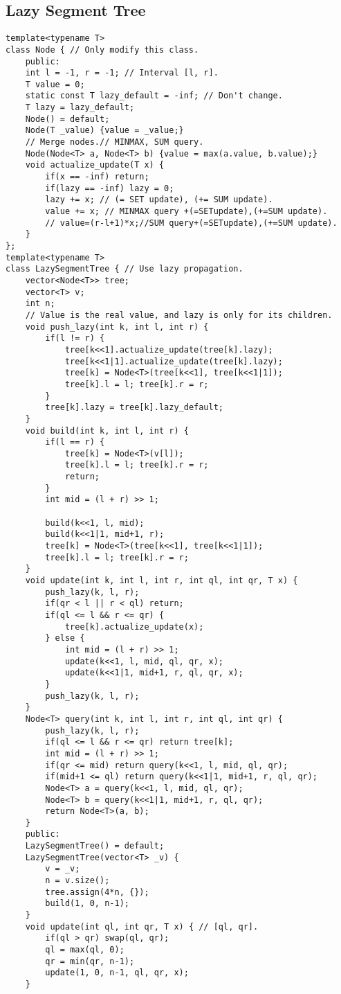 \documentclass[a4paper]{article}
\begin{document}
\subsection*{Lazy Segment Tree}
\begin{multicols}{2}
\begin{verbatim}
template<typename T>
class Node { // Only modify this class.
    public:
    int l = -1, r = -1; // Interval [l, r].
    T value = 0;
    static const T lazy_default = -inf; // Don't change.
    T lazy = lazy_default;
    Node() = default;
    Node(T _value) {value = _value;}
    // Merge nodes.// MINMAX, SUM query.
    Node(Node<T> a, Node<T> b) {value = max(a.value, b.value);} 
    void actualize_update(T x) {
        if(x == -inf) return;
        if(lazy == -inf) lazy = 0;
        lazy += x; // (= SET update), (+= SUM update).
        value += x; // MINMAX query +(=SETupdate),(+=SUM update).
        // value=(r-l+1)*x;//SUM query+(=SETupdate),(+=SUM update).
    }
};
template<typename T>
class LazySegmentTree { // Use lazy propagation.
    vector<Node<T>> tree;
    vector<T> v;
    int n;
    // Value is the real value, and lazy is only for its children.
    void push_lazy(int k, int l, int r) {
        if(l != r) {
            tree[k<<1].actualize_update(tree[k].lazy);
            tree[k<<1|1].actualize_update(tree[k].lazy);
            tree[k] = Node<T>(tree[k<<1], tree[k<<1|1]);
            tree[k].l = l; tree[k].r = r;
        }
        tree[k].lazy = tree[k].lazy_default;
    }
    void build(int k, int l, int r) {
        if(l == r) {
            tree[k] = Node<T>(v[l]);
            tree[k].l = l; tree[k].r = r;
            return;
        }
        int mid = (l + r) >> 1;
        
        build(k<<1, l, mid);
        build(k<<1|1, mid+1, r);
        tree[k] = Node<T>(tree[k<<1], tree[k<<1|1]);
        tree[k].l = l; tree[k].r = r;
    }
    void update(int k, int l, int r, int ql, int qr, T x) {
        push_lazy(k, l, r);
        if(qr < l || r < ql) return;
        if(ql <= l && r <= qr) {
            tree[k].actualize_update(x);
        } else {
            int mid = (l + r) >> 1;
            update(k<<1, l, mid, ql, qr, x);
            update(k<<1|1, mid+1, r, ql, qr, x);
        }
        push_lazy(k, l, r);
    }
    Node<T> query(int k, int l, int r, int ql, int qr) {
        push_lazy(k, l, r);
        if(ql <= l && r <= qr) return tree[k];
        int mid = (l + r) >> 1;
        if(qr <= mid) return query(k<<1, l, mid, ql, qr);
        if(mid+1 <= ql) return query(k<<1|1, mid+1, r, ql, qr);
        Node<T> a = query(k<<1, l, mid, ql, qr);
        Node<T> b = query(k<<1|1, mid+1, r, ql, qr);
        return Node<T>(a, b);
    }
    public:
    LazySegmentTree() = default;
    LazySegmentTree(vector<T> _v) {
        v = _v;
        n = v.size();
        tree.assign(4*n, {});
        build(1, 0, n-1);
    }
    void update(int ql, int qr, T x) { // [ql, qr].
        if(ql > qr) swap(ql, qr);
        ql = max(ql, 0);
        qr = min(qr, n-1);
        update(1, 0, n-1, ql, qr, x);
    }
    

\end{verbatim}
\end{multicols}
\end{document}
